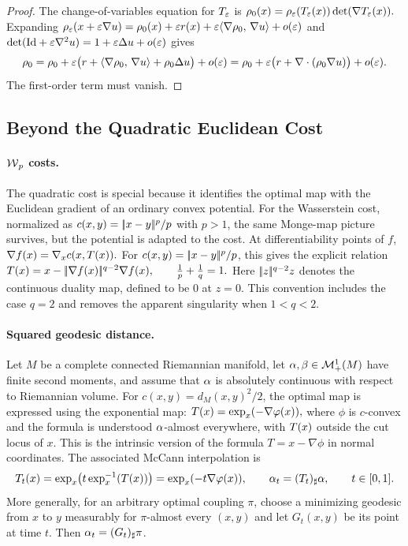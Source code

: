 \begin{proof}
The change-of-variables equation for $T_\varepsilon$ is \(\rho_0(x)=\rho_\varepsilon(T_\varepsilon(x))\det(\nabla T_\varepsilon(x)).\)
Expanding $\rho_\varepsilon(x+\varepsilon\nabla u)=\rho_0(x)+\varepsilon r(x)+\varepsilon\langle \nabla\rho_0,\,\nabla u\rangle+o(\varepsilon)$ and
$\det(\mathrm{Id}+\varepsilon\nabla^2u)=1+\varepsilon\Delta u+o(\varepsilon)$ gives
\[
\rho_0
=
\rho_0+
\varepsilon\bigl(r+\langle \nabla\rho_0,\,\nabla u\rangle+\rho_0\Delta u\bigr)+o(\varepsilon)
=
\rho_0+
\varepsilon\bigl(r+\nabla\cdot(\rho_0\nabla u)\bigr)+o(\varepsilon).
\]
The first-order term must vanish.
\end{proof}
\subsection{Beyond the Quadratic Euclidean Cost}
\label{sec-beyond-quadratic-euclidean-cost}
\paragraph{\texorpdfstring{$\operatorname{\mathcal{W}}_p$ costs.}{Wp costs}}
The quadratic cost is special because it identifies the optimal map with the Euclidean gradient of an ordinary convex potential. For the Wasserstein cost, normalized as \(c(x,y)=|\!| x-y |\!|^p/p\) with \(p>1\), the same Monge-map picture survives, but the potential is adapted to the cost. At differentiability points of \(f\),
\(\nabla f(x)=\nabla_x c(x,T(x)).\)
For \(c(x,y)=|\!| x-y |\!|^p/p\), this gives the explicit relation
\(T(x)=x-|\!| \nabla f(x) |\!|^{q-2}\nabla f(x), \qquad \frac1p+\frac1q=1.\)
Here $|\!| z |\!|^{q-2}z$ denotes the continuous duality map, defined to be $0$ at $z=0$. This convention includes the case $q=2$ and removes the apparent singularity when $1<q<2$.

\paragraph{Squared geodesic distance.}
Let $M$ be a complete connected Riemannian manifold, let $\alpha,\beta\in\mathcal{M}_+^1(M)$ have finite second moments, and assume that $\alpha$ is absolutely continuous with respect to Riemannian volume. For $c(x,y)=d_M(x,y)^2/2$, the optimal map is expressed using the exponential map:
\(T(x)=\exp_x(-\nabla\varphi(x)),\)
where \(\phi\) is \(c\)-convex and the formula is understood $\alpha$-almost everywhere, with $T(x)$ outside the cut locus of $x$. This is the intrinsic version of the formula \(T=x-\nabla\phi\) in normal coordinates. The associated McCann interpolation is
\[
T_t(x)
=
\exp_x\!\left(t\exp_x^{-1}(T(x))\right)
=
\exp_x(-t\nabla\varphi(x)),
\qquad
\alpha_t=(T_t)_\sharp\alpha,
\qquad t\in[0,1].
\]
More generally, for an arbitrary optimal coupling $\pi$, choose a minimizing geodesic from $x$ to $y$ measurably for $\pi$-almost every $(x,y)$ and let $G_t(x,y)$ be its point at time $t$. Then $\alpha_t=(G_t)_\sharp\pi$.

